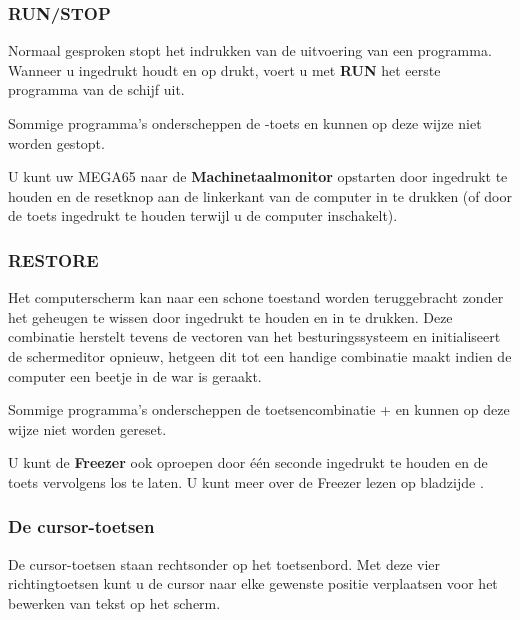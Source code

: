 \subsubsection{RUN/STOP}
Normaal gesproken stopt het indrukken van  de uitvoering van een programma. Wanneer u  ingedrukt houdt en op  drukt, voert u met {\bf RUN} het eerste programma van de schijf uit.

Sommige programma's onderscheppen de -toets en kunnen op deze wijze niet worden gestopt.

U kunt uw MEGA65 naar de {\bf Machinetaalmonitor} opstarten door  ingedrukt te houden en de resetknop aan de linkerkant van de computer in te drukken (of door de toets ingedrukt te houden terwijl u de computer inschakelt).

\subsubsection{RESTORE}
Het computerscherm kan naar een schone toestand worden teruggebracht zonder het geheugen te wissen door  ingedrukt te houden en  in te drukken. Deze combinatie herstelt tevens de vectoren van het besturingssysteem en initialiseert de schermeditor opnieuw, hetgeen dit tot een handige combinatie maakt indien de computer een beetje in de war is geraakt.

Sommige programma's onderscheppen de toetsencombinatie  +  en kunnen op deze wijze niet worden gereset.

U kunt de {\bf Freezer} ook oproepen door  één seconde ingedrukt te houden en de toets vervolgens los te laten. U kunt meer over de Freezer lezen op bladzijde \pageref{sec:freezer}.

\subsubsection{De cursor-toetsen}
\nopagebreak
De cursor-toetsen staan rechtsonder op het toetsenbord. Met deze vier richtingtoetsen kunt u de cursor naar elke gewenste positie verplaatsen voor het bewerken van tekst op het scherm.


